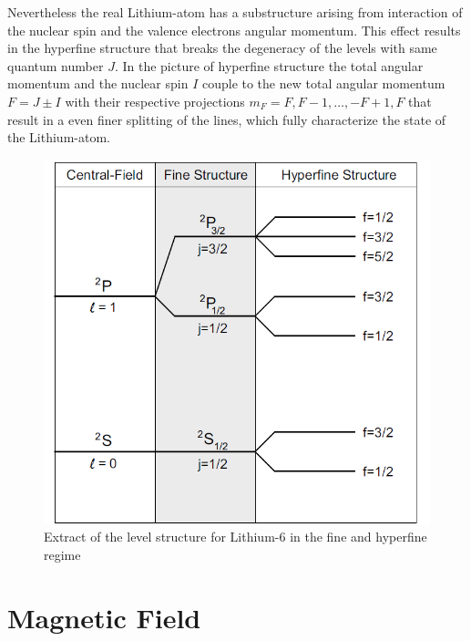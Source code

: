 Nevertheless the real Lithium-atom has a substructure arising from interaction of the nuclear spin and the valence electrons angular momentum. This effect results in the hyperfine structure that breaks the degeneracy of the levels with same quantum number $J$. In the picture of hyperfine structure the total angular momentum and the nuclear spin $I$ couple to the new total angular momentum $F=J\pm I$ with their respective projections $m_F=F,F-1,\dots,-F+1,F$ that result in a even finer splitting of the lines, which fully characterize the state of the Lithium-atom.

\begin{figure}[H]

\begin{center}
\includegraphics[scale=.5] {levels1}
\end{center}
\caption{Extract of the level structure for Lithium-6 in the fine and hyperfine regime \cite{gehm}}
\label{levels1}
\end{figure}

\section{Magnetic Field}

